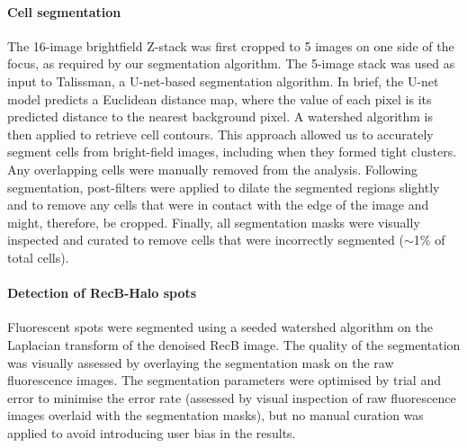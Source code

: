 \paragraph{Cell segmentation}
The 16-image brightfield Z-stack was first cropped to 5 images on one side of the focus, as required by our segmentation algorithm. The 5-image stack was used as input to Talissman, a U-net-based segmentation algorithm. In brief, the U-net model predicts a Euclidean distance map, where the value of each pixel is its predicted distance to the nearest background pixel. A watershed algorithm is then applied to retrieve cell contours. This approach allowed us to accurately segment cells from bright-field images, including when they formed tight clusters. Any overlapping cells were manually removed from the analysis. Following segmentation, post-filters were applied to dilate the segmented regions slightly and to remove any cells that were in contact with the edge of the image and might, therefore, be cropped. Finally, all segmentation masks were visually inspected and curated to remove cells that were incorrectly segmented ($\sim$1\% of total cells).

\paragraph*{Detection of RecB-Halo spots}
Fluorescent spots were seg\-men\-ted using a seeded watershed algorithm on the Laplacian transform of the denoised RecB image. The quality of the segmentation was visually assessed by overlaying the segmentation mask on the raw fluorescence images. The segmentation parameters were optimised by trial and error to minimise the error rate (assessed by visual inspection of raw fluorescence images overlaid with the segmentation masks), but no manual curation was applied to avoid introducing user bias in the results.

